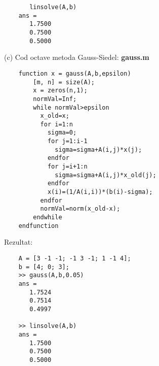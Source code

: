 \documentclass[12pt]{article}
\begin{document}
\begin{sloppypar}
\begin{scriptsize}
\begin{verbatim}
       linsolve(A,b)
    ans =
       1.7500
       0.7500
       0.5000
\end{verbatim}\end{scriptsize}
\newpage

(c) Cod octave metoda Gauss-Siedel: \textbf{gauss.m}
\begin{scriptsize}\begin{verbatim}
    function x = gauss(A,b,epsilon)
        [m, n] = size(A);
        x = zeros(n,1);
        normVal=Inf; 
        while normVal>epsilon
          x_old=x;
          for i=1:n
            sigma=0;
            for j=1:i-1
              sigma=sigma+A(i,j)*x(j);
            endfor 
            for j=i+1:n
              sigma=sigma+A(i,j)*x_old(j);
            endfor
            x(i)=(1/A(i,i))*(b(i)-sigma);
          endfor
          normVal=norm(x_old-x);
        endwhile
    endfunction
\end{verbatim}\end{scriptsize}
Rezultat:
\begin{scriptsize}
    \begin{verbatim}
    A = [3 -1 -1; -1 3 -1; 1 -1 4];
    b = [4; 0; 3];
    >> gauss(A,b,0.05)
    ans =
       1.7524
       0.7514
       0.4997

    >> linsolve(A,b)
    ans =
       1.7500
       0.7500
       0.5000
    \end{verbatim}
\end{scriptsize}
\end{sloppypar}
\end{document}
